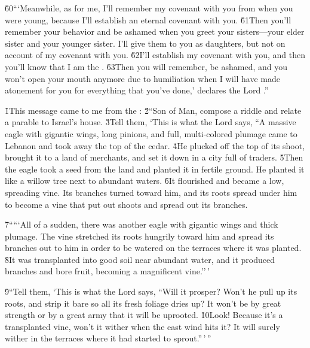 \v{60}```Meanwhile, as for me, I'll remember my covenant with you from when you were young, because I'll establish an eternal covenant with you. \v{61}Then you'll remember your behavior and be ashamed when you greet your sisters---your elder sister and your younger sister. I'll give them to you as daughters, but not on account of my covenant with you. \v{62}I'll establish my covenant with you, and then you'll know that I am the . \v{63}Then you will remember, be ashamed, and you won't open your mouth anymore due to humiliation when I will have made atonement for you for everything that you've done,' declares the Lord .''

\v{1}This message came to me from the : \v{2}``Son of Man, compose a riddle and relate a parable to Israel's house. \v{3}Tell them, `This is what the Lord  says, ``A massive eagle with gigantic wings, long pinions, and full, multi-colored plumage came to Lebanon and took away the top of the cedar. \v{4}He plucked off the top of its shoot, brought it to a land of merchants, and set it down in a city full of traders. \v{5}Then the eagle took a seed from the land and planted it in fertile ground. He planted it like a willow tree next to abundant waters. \v{6}It flourished and became a low, spreading vine. Its branches turned toward him, and its roots spread under him to become a vine that put out shoots and spread out its branches.

\v{7}`````All of a sudden, there was another eagle with gigantic wings and thick plumage. The vine stretched its roots hungrily toward him and spread its branches out to him in order to be watered on the terraces where it was planted. \v{8}It was transplanted into good soil near abundant water, and it produced branches and bore fruit, becoming a magnificent vine.''\,'

\v{9}``Tell them, `This is what the Lord  says, ``Will it prosper? Won't he pull up its roots, and strip it bare so all its fresh foliage dries up? It won't be by great strength or by a great army that it will be uprooted. \v{10}Look! Because it's a transplanted vine, won't it wither when the east wind hits it? It will surely wither in the terraces where it had started to sprout.''\,'\,''


